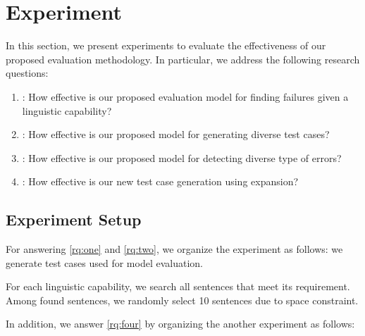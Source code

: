 \section{Experiment}
\label{sec:experiment}
%
In this section, we present experiments to
evaluate the effectiveness of our proposed evaluation methodology. In
particular, we address the following research questions:

\begin{enumerate}[label=\textbf{RQ\arabic*}]
\item \label{rq:one}: How effective is our proposed evaluation model
  for finding failures given a linguistic capability?
\item \label{rq:two}: How effective is our proposed model for
  generating diverse test cases? %
\item \label{rq:three}: How effective is our proposed model for
  detecting diverse type of errors? %
\item \label{rq:four}: How effective is our new test case generation
  using \cfg expansion? %
\end{enumerate}

\subsection{Experiment Setup}

For answering \ref{rq:one} and \ref{rq:two}, we organize the
experiment as follows: we generate test cases used for model
evaluation.

 For each linguistic capability, we
search all sentences that meet its requirement. Among found sentences,
we randomly select 10 sentences due to space constraint.



In addition, we answer \ref{rq:four} by organizing the another
experiment as follows:



